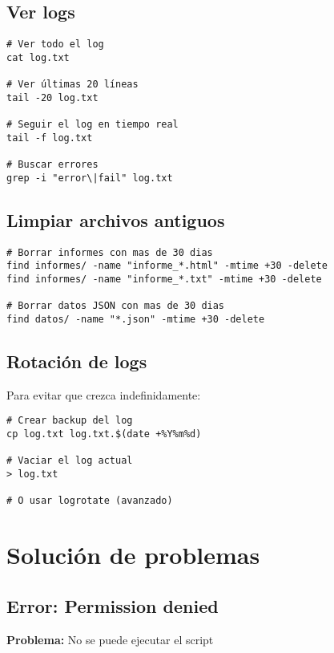 \subsection{Ver logs}

\begin{lstlisting}[style=bash]
# Ver todo el log
cat log.txt

# Ver últimas 20 líneas
tail -20 log.txt

# Seguir el log en tiempo real
tail -f log.txt

# Buscar errores
grep -i "error\|fail" log.txt
\end{lstlisting}

\subsection{Limpiar archivos antiguos}

\begin{lstlisting}[style=bash]
# Borrar informes con mas de 30 dias
find informes/ -name "informe_*.html" -mtime +30 -delete
find informes/ -name "informe_*.txt" -mtime +30 -delete

# Borrar datos JSON con mas de 30 dias
find datos/ -name "*.json" -mtime +30 -delete
\end{lstlisting}

\subsection{Rotación de logs}

Para evitar que  crezca indefinidamente:

\begin{lstlisting}[style=bash]
# Crear backup del log
cp log.txt log.txt.$(date +%Y%m%d)

# Vaciar el log actual
> log.txt

# O usar logrotate (avanzado)
\end{lstlisting}

\section{Solución de problemas}

\subsection{Error: Permission denied}

\textbf{Problema:} No se puede ejecutar el script

